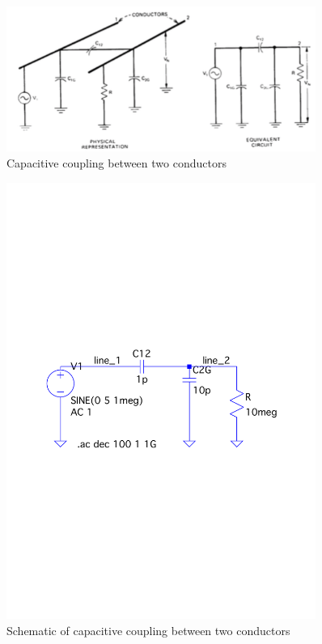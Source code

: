 \documentclass[12pt,a4paper,UKenglish]{article}
\begin{document}
\begin{figure} [H]
  \centering 
  \includegraphics[width=0.9\textwidth]{img/two_con.png} 
  \caption{Capacitive coupling between two conductors}
  \label{two_con} 
\end{figure}

\begin{figure} [H]
  \centering 
  \includegraphics[width=0.9\textwidth]{img/sch_4a.pdf} 
  \caption{Schematic of capacitive coupling between two conductors}
  \label{sch_4a} 
\end{figure}
\end{document}
